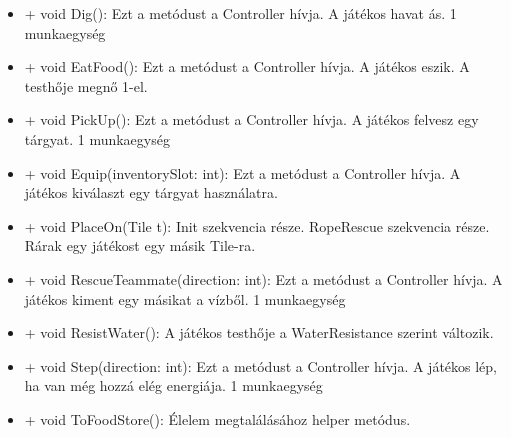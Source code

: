 \begin{itemize}
\begin{itemize}
		\item + void Dig(): Ezt a metódust a Controller hívja. A játékos havat ás. 1 munkaegység
		\item + void EatFood(): Ezt a metódust a Controller hívja. A játékos eszik. A testhője megnő 1-el.
		\item + void PickUp(): Ezt a metódust a Controller hívja. A játékos felvesz egy tárgyat. 1 munkaegység
		\item + void Equip(inventorySlot: int): Ezt a metódust a Controller hívja. A játékos kiválaszt egy tárgyat használatra.
		\item + void PlaceOn(Tile t): Init szekvencia része. RopeRescue szekvencia része. Rárak egy játékost egy másik Tile-ra.
		\item + void RescueTeammate(direction: int): Ezt a metódust a Controller hívja. A játékos kiment egy másikat a vízből. 1 munkaegység
		\item + void ResistWater(): A játékos testhője a WaterResistance szerint változik.
		\item + void Step(direction: int): Ezt a metódust a Controller hívja. A játékos lép, ha van még hozzá elég energiája. 1 munkaegység
		\item + void ToFoodStore(): Élelem megtalálásához helper metódus.
	\end{itemize}
\end{itemize}

